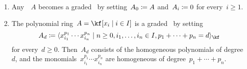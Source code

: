 \begin{examples}
  \label{examples of graded algebras}
  \leavevmode
  \begin{enumerate}
    \item
      Any~\algebra{$\kf$}~$A$ becomes a graded~\algebra{$\kf$} by setting~$A_0 \coloneqq A$ and~$A_i \coloneqq 0$ for every~$i \geq 1$.
    \item
      The polynomial ring~$A = \kf[x_i \suchthat i \in I]$ is a graded~\algebra{$\kf$} by setting
      \[
        A_d
        \defined
        \gen{
          x_{i_1}^{p_1} \dotsm x_{i_n}^{p_n}
        \suchthat
          n \geq 0,
          i_1, \dotsc, i_n \in I,
          p_1 + \dotsb + p_n = d
        }_{\kf}
      \]
      for every~$d \geq 0$.
      Then~$A_d$ consists of the homogeneous polynomials of degree~$d$, and the monomials~$x_{i_1}^{p_1} \dotsm x_{i_n}^{p_n}$ are homogeneous of degree~$p_1 + \dotsb + p_n$.
      

\end{enumerate}
\end{examples}
